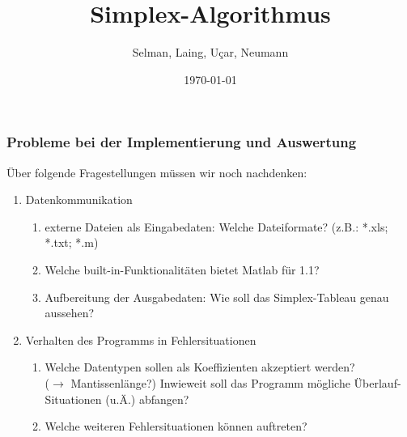 \documentclass{beamer}
\title{Simplex-Algorithmus}
\author{Selman, Laing, U\c{c}ar, Neumann}
\date{\today}
\begin{document}
\begin{frame}
\frametitle{Probleme bei der Implementierung und Auswertung} 
\"Uber folgende Fragestellungen m\"ussen wir noch nachdenken:
\\
\pause
\begin{enumerate}
 \item<1-> Datenkommunikation
 \pause
 \\
  \begin{enumerate}
   \item<1-> externe Dateien als Eingabedaten: Welche Dateiformate? (z.B.: *.xls; *.txt; *.m)
   \pause
   \item<2-> Welche built-in-Funktionalit\"aten bietet Matlab f\"ur 1.1? 
   \pause
   \item<3-> Aufbereitung der Ausgabedaten: Wie soll das Simplex-Tableau genau aussehen?
   \pause
  \end{enumerate}
 \item<2-> Verhalten des Programms in Fehlersituationen
 \pause
  \begin{enumerate}
   \item<1-> Welche Datentypen sollen als Koeffizienten akzeptiert werden? \\ ($\rightarrow$ Mantissenl\"ange?)
             Inwieweit soll das Programm m\"ogliche \"Uberlauf-Situationen (u.\"A.) abfangen? 
   \pause
   \item<2-> Welche weiteren Fehlersituationen können auftreten?
  \end{enumerate}
\end{enumerate}
\end{frame}

\end{document}

